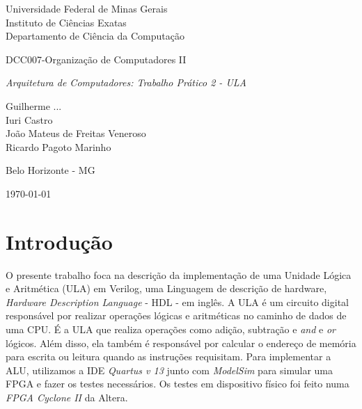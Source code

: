 \documentclass[11pt,a4paper,titlepage]{article}
\newcommand{\titulo}{\textit{Arquitetura de Computadores: Trabalho Prático 2 - ULA}}
\begin{document}
\begin{titlepage}
\begin{center}

\begin{large}
Universidade Federal de Minas Gerais\\
Instituto de Ciências Exatas\\
Departamento de Ciência da Computação\\
\end{large}

\vspace{20mm}

\begin{Large}
DCC007-Organização de Computadores II
\end{Large}

\vspace{20mm}

\begin{LARGE}
\titulo
\end{LARGE}


\vspace{30mm}

\begin{Large}
\begin{center}
Guilherme ...\\ Iuri Castro\\ João Mateus de Freitas Veneroso\\ Ricardo Pagoto Marinho \\
\end{center}
\end{Large}


\vspace{60mm}

{\sc Belo Horizonte - MG}

{\sc \today}

\end{center}
\end{titlepage}


\section{Introdução}\label{sec:intro}

O presente trabalho foca na descrição da implementação de uma Unidade Lógica e Aritmética (ULA) em Verilog, uma Linguagem de descrição de hardware, \textit{Hardware Description Language} - HDL - em inglês.
A ULA é um circuito digital responsável por realizar operações lógicas e aritméticas no caminho de dados de uma CPU.
É a ULA que realiza operações como adição, subtração e \textit{and} e \textit{or} lógicos.
Além disso, ela também é responsável por calcular o endereço de memória para escrita ou leitura quando as instruções requisitam.
Para implementar a ALU, utilizamos a IDE \textit{Quartus v 13} junto com \textit{ModelSim} para simular uma FPGA e fazer os testes necessários.
Os testes em dispositivo físico foi feito numa \textit{FPGA Cyclone II} da Altera.
\end{document}
